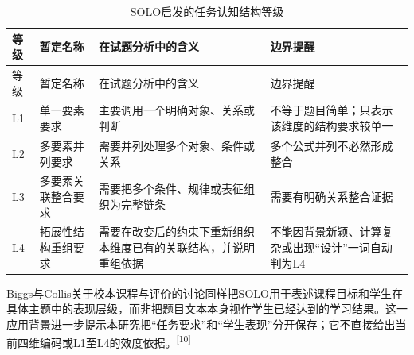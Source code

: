\documentclass[
  12pt,
  a4paper,twoside,openany]{ctexbook}
\begin{document}
\begin{longtable}[]{@{}
  >{\raggedright\arraybackslash}p{}
  >{\raggedright\arraybackslash}p{}
  >{\raggedright\arraybackslash}p{}
  >{\raggedright\arraybackslash}p{}@{}}
\caption{SOLO启发的任务认知结构等级}\tabularnewline
\toprule\noalign{}
\rowcolor{ThesisPale}
\begin{minipage}[b]{\linewidth}\raggedright
等级
\end{minipage} & \begin{minipage}[b]{\linewidth}\raggedright
暂定名称
\end{minipage} & \begin{minipage}[b]{\linewidth}\raggedright
在试题分析中的含义
\end{minipage} & \begin{minipage}[b]{\linewidth}\raggedright
边界提醒
\end{minipage} \\
\midrule\noalign{}
\endfirsthead
\toprule\noalign{}
\rowcolor{ThesisPale}
\begin{minipage}[b]{\linewidth}\raggedright
等级
\end{minipage} & \begin{minipage}[b]{\linewidth}\raggedright
暂定名称
\end{minipage} & \begin{minipage}[b]{\linewidth}\raggedright
在试题分析中的含义
\end{minipage} & \begin{minipage}[b]{\linewidth}\raggedright
边界提醒
\end{minipage} \\
\midrule\noalign{}
\endhead
\bottomrule\noalign{}
\endlastfoot
L1 & 单一要素要求 & 主要调用一个明确对象、关系或判断 &
不等于题目简单；只表示该维度的结构要求较单一 \\
L2 & 多要素并列要求 & 需要并列处理多个对象、条件或关系 &
多个公式并列不必然形成整合 \\
L3 & 多要素关联整合要求 & 需要把多个条件、规律或表征组织为完整链条 &
需要有明确关系整合证据 \\
L4 & 拓展性结构重组要求 &
需要在改变后的约束下重新组织本维度已有的关联结构，并说明重组依据 &
不能因背景新颖、计算复杂或出现``设计''一词自动判为L4 \\
\end{longtable}

Biggs与Collis关于校本课程与评价的讨论同样把SOLO用于表述课程目标和学生在具体主题中的表现层级，而非把题目文本本身视作学生已经达到的学习结果。这一应用背景进一步提示本研究把``任务要求''和``学生表现''分开保存；它不直接给出当前四维编码或L1至L4的效度依据。\textsuperscript{[10]}
\end{document}
